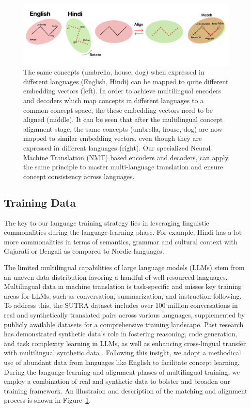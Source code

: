\documentclass{article}
\begin{document}
\begin{figure}[htbp]
\centering
\includegraphics[width=\linewidth]{images/language_matching_small.png}
  \caption{The same concepts (umbrella, house, dog) when expressed in different languages (English, Hindi) can be mapped to quite different embedding vectors (left). In order to achieve multilingual encoders and decoders which map concepts in different languages to a common concept space, the these embedding vectors need to be aligned (middle). It can be seen that after the multilingual concept alignment stage, the same concepts (umbrella, house, dog) are now mapped to similar embedding vectors, even though they are expressed in different languages (right). Our specialized Neural Machine Translation (NMT) based encoders and decoders, can apply the same principle to master multi-language translation and ensure concept consistency across languages.}
\label{fig:language_matching}
\end{figure}

\subsection{Training Data}

The key to our language training strategy lies in leveraging linguistic commonalities during the language learning phase.
For example, Hindi has a lot more commonalities in terms of semantics, grammar and cultural context with Gujarati or Bengali as compared to Nordic languages.

The limited multilingual capabilities of large language models (LLMs) stem from an uneven data distribution favoring a handful of well-resourced languages.
Multilingual data in machine translation is task-specific and misses key training areas for LLMs, such as conversation, summarization, and instruction-following.
To address this, the SUTRA dataset includes over 100 million conversations in real and synthetically translated pairs across various languages, supplemented by publicly available datasets for a comprehensive training landscape.
Past research has demonstrated synthetic data's role in fostering reasoning, code generation, and task complexity learning in LLMs, as well as enhancing cross-lingual transfer with multilingual synthetic data \citep{lai2023okapi,whitehouse2023llm}.
Following this insight, we adopt a methodical use of abundant data from languages like English to facilitate concept learning.
During the language learning and alignment phases of multilingual training, we employ a combination of real and synthetic data to bolster and broaden our training framework.
An illustraion and description of the matching and alignment process is shown in Figure~\ref{fig:language_matching}.
\end{document}
